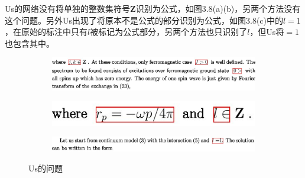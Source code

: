 Us的网络没有将单独的整数集符号$\mathbf{Z}$识别为公式，如图3.8(a)(b)，另两个方法没有这个问题。另外Us出现了将原本不是公式的部分识别为公式，如图3.8(c)中的$l=1$，在原始的标注中只有$l$被标记为公式部分，另两个方法也只识别了$l$，但Us将$=1$也包含其中。
\begin{figure}[hp]
    \centering

    \begin{subfigure}[b]{\linewidth}
    \centering
    \includegraphics[scale=0.3]{eps/us1.eps}
    \caption{\label{fig:fig1}}
    \end{subfigure}

    \begin{subfigure}[b]{\linewidth}
    \centering
    \includegraphics[scale=0.3]{eps/us2.eps}
    \caption{\label{fig:fig2}}
    \end{subfigure}

    \begin{subfigure}[b]{\linewidth}
    \centering
    \includegraphics[scale=0.3]{eps/us3.eps}
    \caption{\label{fig:fig3}}
    \end{subfigure}

    \caption{Us的问题}
    \label{fig:label}
\end{figure}

